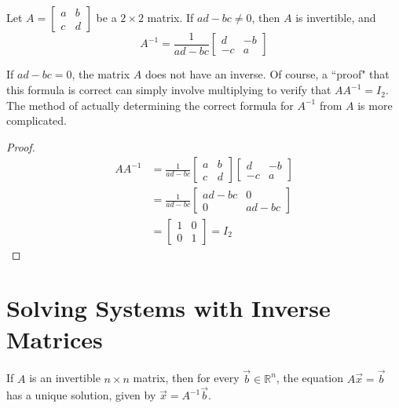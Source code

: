 \documentclass[letterpaper,12pt]{article}
\begin{document}
\begin{theorem}
Let $A = \begin{bmatrix} a & b \\ c & d \end{bmatrix}$ be a $2 \times 2$ matrix. If $ad - bc \neq 0$, then $A$ is invertible, and
\begin{equation*}
    \boxed{A^{-1} = \frac{1}{ad - bc} \begin{bmatrix} d & -b \\ -c & a \end{bmatrix}}
\end{equation*}
\end{theorem}

If $ad - bc = 0$, the matrix $A$ does not have an inverse. Of course, a ``proof" that this formula is correct can simply involve multiplying to verify that $AA^{-1} = I_2$. The method of actually determining the correct formula for $A^{-1}$ from $A$ is more complicated.

\begin{proof}

\begin{align*}
    AA^{-1} & = \frac{1}{ad - bc} \begin{bmatrix} a & b \\ c & d \end{bmatrix} \begin{bmatrix} d & -b \\ -c & a \end{bmatrix} \\
    & = \frac{1}{ad - bc} \begin{bmatrix} ad - bc & 0 \\ 0 & ad - bc \end{bmatrix} \\
    & = \begin{bmatrix} 1 & 0 \\ 0 & 1 \end{bmatrix} = I_2
\end{align*}
\end{proof}


\section*{Solving Systems with Inverse Matrices}
\begin{theorem}
If $A$ is an invertible $n \times n$ matrix, then for every $\vec{b} \in \mathbb{R}^n$, the equation $A\vec{x} = \vec{b}$ has a unique solution, given by $\vec{x} = A^{-1} \vec{b}$.
\end{theorem}
\end{document}

